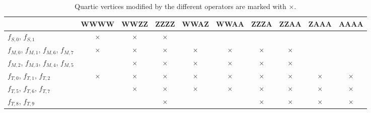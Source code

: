 \begin{table}
{\footnotesize
\centering
\begin{tabular}[!htbp]{|p{1.8cm} | c  |c  |c  |c  |c  |c  |c | c  |c |}
\hline
    & WWWW & WWZZ & ZZZZ & WWAZ & WWAA & ZZZA & ZZAA & ZAAA & AAAA \\
\hline
$f_{S,0}$, $f_{S,1}$ &$\times$ & $\times$&$\times$ & & & & & & \\
\hline
$f_{M,0}$, $f_{M,1}$, $f_{M,6}$, $f_{M,7}$  &$\times$ &$\times$ &$\times$ &$\times$ &$\times$ &$\times$ &$\times$ & & \\
\hline
$f_{M,2}$, $f_{M,3}$, $f_{M,4}$, $f_{M,5}$  & &$\times$ &$\times$ &$\times$ &$\times$ &$\times$ &$\times$ & & \\
\hline
$f_{T,0}$, $f_{T,1}$, $f_{T,2}$ &$\times$ &$\times$ &$\times$ &$\times$ &$\times$ &$\times$ &$\times$ &$\times$ &$\times$ \\
\hline
$f_{T,5}$, $f_{T,6}$, $f_{T,7}$ & &$\times$ &$\times$ &$\times$ &$\times$ &$\times$ &$\times$ &$\times$ &$\times$ \\
\hline
$f_{T,8}$, $f_{T,9}$  & & &$\times$ & & &$\times$ &$\times$ &$\times$ &$\times$ \\
\hline
\end{tabular}
\caption{Quartic vertices modified by the different operators are marked with $\times$.}
\label{table:aQGC_alloperator}
}
\end{table}

